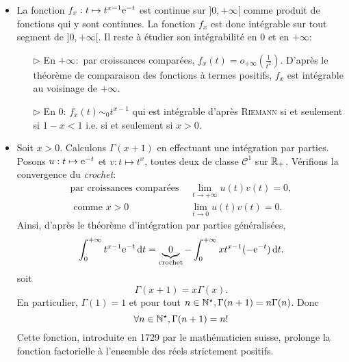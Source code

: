 \begin{preuve}
    \begin{itemize}
        \item La fonction $f_x:t \mapsto t^{x-1} \mathrm{e}^{-t}$ est continue sur $]0, + \infty[$ comme produit de fonctions qui y sont continues. La fonction $f_x$ est donc intégrable sur tout segment de $]0, +\infty[$. Il reste à étudier son intégrabilité en $0$ et en $+ \infty$:
        \begin{itemize}
            \item[$\triangleright$] En $+\infty:$ par croissances comparées, $f_x(t) = o_{+\infty} \left(\frac{1}{t^2} \right)$. D'après le théorème de comparaison des fonctions à termes positifs, $f_x$ est intégrable au voisinage de $+\infty$.
            \item[$\triangleright$] En $0$: $f_x(t) \sim_0 t^{x-1}$ qui est intégrable d'après \textsc{Riemann} si et seulement si $1-x < 1$ i.e. si et seulement si $x > 0$.
        \end{itemize}
        

        \item Soit $x > 0$. Calculons $\Gamma(x+1)$ en effectuant une intégration par parties. Posons $u:t \mapsto \mathrm{e}^{-t}$ et $v:t \mapsto t^x$, toutes deux de classe $\mathscr{C}^1$ sur $\mathbb{R}_+$. Vérifions la convergence du \emph{crochet}:
        \begin{align*}
            \text{par croissances comparées } & \lim_{t \to +\infty} u(t) v(t) = 0, \\
            \text{ comme } x > 0 & \lim_{t \to 0} u(t) v(t) = 0.
        \end{align*}
        Ainsi, d'après le théorème d'intégration par parties généralisées, 
        $$\int_{0}^{+\infty} t^{x-1} \mathrm{e}^{-t} \, \mathrm{d} t = \underbrace{0}_{\text{crochet}} - \int_{0}^{+\infty} xt^{x-1} (-\mathrm{e}^{-t}) \, \mathrm{d} t.$$
        soit 
        $$\Gamma(x+1) = x \Gamma(x).$$
        En particulier, $\Gamma(1) = 1$ et pour tout $n \in \mathbb{N}^\star, \Gamma(n+1) = n \Gamma(n)$. Donc
        $$\forall n \in \mathbb{N}^\star, \Gamma(n+1) = n!$$
        Cette fonction, introduite en 1729 par le mathématicien suisse, prolonge la fonction factorielle à l'ensemble des réels strictement positifs.
    \end{itemize}
\end{preuve}
